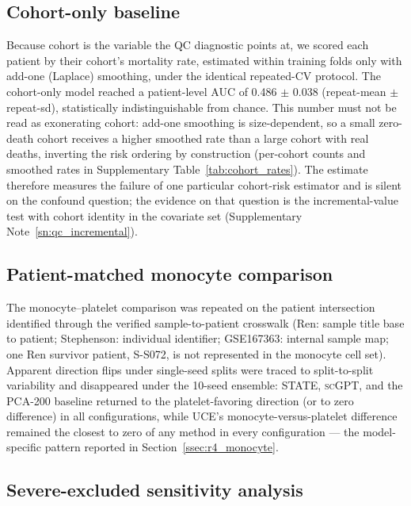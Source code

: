 \documentclass[11pt,a4paper]{article}
\newcommand{\model}[1]{\textsc{#1}}
\begin{document}
\subsection{Cohort-only baseline}
\label{sn:cohort_baseline}

Because cohort is the variable the QC diagnostic points at, we scored each
patient by their cohort's mortality rate, estimated within training folds
only with add-one (Laplace) smoothing, under the identical repeated-CV
protocol. The cohort-only model reached a patient-level AUC of
0.486 $\pm$ 0.038 (repeat-mean $\pm$ repeat-sd), statistically
indistinguishable from chance. This number must not be read as exonerating
cohort: add-one smoothing is size-dependent, so a small zero-death cohort
receives a higher smoothed rate than a large cohort with real deaths,
inverting the risk ordering by construction (per-cohort counts and smoothed
rates in Supplementary Table~\ref{tab:cohort_rates}). The estimate therefore
measures the failure of one particular cohort-risk estimator and is silent on
the confound question; the evidence on that question is the incremental-value
test with cohort identity in the covariate set
(Supplementary Note~\ref{sn:qc_incremental}).

\subsection{Patient-matched monocyte comparison}
\label{sn:monocyte_matched}

The monocyte--platelet comparison was repeated on the patient intersection
identified through the verified sample-to-patient crosswalk (Ren: sample title
base to patient; Stephenson: individual identifier; GSE167363: internal sample
map; one Ren survivor patient, S-S072, is not represented in the monocyte
cell set). Apparent direction flips under single-seed splits were traced to
split-to-split variability and disappeared under the 10-seed ensemble:
\model{STATE}, \model{scGPT}, and the PCA-200 baseline returned to the
platelet-favoring direction (or to zero difference) in all configurations,
while \model{UCE}'s monocyte-versus-platelet difference remained the closest
to zero of any method in every configuration --- the model-specific pattern
reported in Section~\ref{ssec:r4_monocyte}.

\subsection{Severe-excluded sensitivity analysis}
\label{sn:severe}
\end{document}
